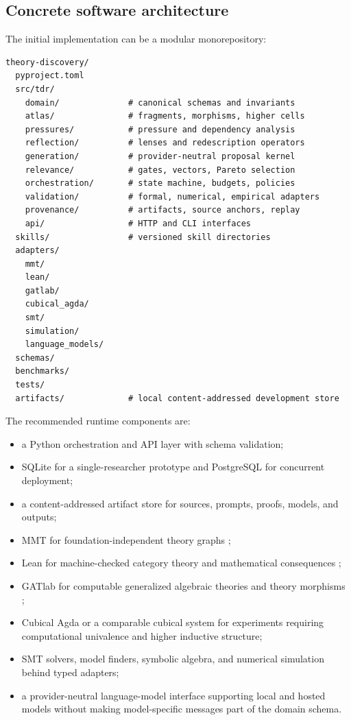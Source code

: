 \documentclass[11pt]{article}
\begin{document}
\subsection{Concrete software architecture}

The initial implementation can be a modular monorepository:
\begin{lstlisting}[style=spec,caption={Proposed repository layout.}]
theory-discovery/
  pyproject.toml
  src/tdr/
    domain/              # canonical schemas and invariants
    atlas/               # fragments, morphisms, higher cells
    pressures/           # pressure and dependency analysis
    reflection/          # lenses and redescription operators
    generation/          # provider-neutral proposal kernel
    relevance/           # gates, vectors, Pareto selection
    orchestration/       # state machine, budgets, policies
    validation/          # formal, numerical, empirical adapters
    provenance/          # artifacts, source anchors, replay
    api/                 # HTTP and CLI interfaces
  skills/                # versioned skill directories
  adapters/
    mmt/
    lean/
    gatlab/
    cubical_agda/
    smt/
    simulation/
    language_models/
  schemas/
  benchmarks/
  tests/
  artifacts/             # local content-addressed development store
\end{lstlisting}

The recommended runtime components are:
\begin{itemize}
  \item a Python orchestration and API layer with schema validation;
  \item SQLite for a single-researcher prototype and PostgreSQL for concurrent deployment;
  \item a content-addressed artifact store for sources, prompts, proofs, models, and outputs;
  \item MMT for foundation-independent theory graphs \cite{rabe2016};
  \item Lean for machine-checked category theory and mathematical consequences
  \cite{leanmathlib};
  \item GATlab for computable generalized algebraic theories and theory morphisms
  \cite{gatlab};
  \item Cubical Agda or a comparable cubical system for experiments requiring computational univalence
  and higher inductive structure;
  \item SMT solvers, model finders, symbolic algebra, and numerical simulation behind typed adapters;
  \item a provider-neutral language-model interface supporting local and hosted models without making
  model-specific messages part of the domain schema.
\end{itemize}
\end{document}
